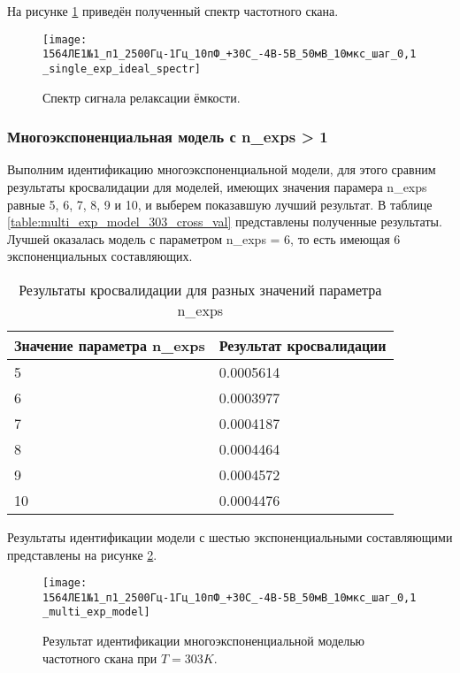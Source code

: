 	На рисунке \ref{pic:spectr_single_exp_ideal_303} приведён полученный спектр
	частотного скана.

	\begin{figure}[!htp]
		\centering
		\texttt{[image: 1564ЛЕ1№1\_п1\_2500Гц-1Гц\_10пФ\_+30С\_-4В-5В\_50мВ\_10мкс\_шаг\_0,1\_single\_exp\_ideal\_spectr]}
		\caption{Спектр сигнала релаксации ёмкости.}
		\label{pic:spectr_single_exp_ideal_303}
	\end{figure}


	\newpage
	\subsubsection{Многоэкспоненциальная модель с n\_exps > 1}
	Выполним идентификацию многоэкспоненциальной модели, для этого сравним
	результаты кросвалидации для моделей, имеющих значения парамера n\_exps
	равные 5, 6, 7, 8, 9 и 10, и выберем показавшую лучший результат. В таблице
	\ref{table:multi_exp_model_303_cross_val} представлены полученные результаты.
	Лучшей оказалась модель с параметром n\_exps = 6, то есть имеющая 6 
	экспоненциальных составляющих.

	\begin{table}[!htp]
		\centering
		\caption{Результаты кросвалидации для разных значений параметра n\_exps}
		\begin{tabular}{|l|l|}
		\hline
		Значение параметра n\_exps & Результат кросвалидации \\ \hline
		5                          & 0.0005614               \\ \hline
		6                          & 0.0003977               \\ \hline
		7                          & 0.0004187               \\ \hline
		8                          & 0.0004464               \\ \hline
		9                          & 0.0004572               \\ \hline
		10                         & 0.0004476               \\ \hline
		\end{tabular}
		\label{table:multi_exp_model_283_cross_val}
	\end{table}

	Результаты идентификации модели с шестью экспоненциальными составляющими
	представлены на рисунке \ref{pic:multi_exp_model_303}.

	\begin{figure}[!htp]
		\centering
		\texttt{[image: 1564ЛЕ1№1\_п1\_2500Гц-1Гц\_10пФ\_+30С\_-4В-5В\_50мВ\_10мкс\_шаг\_0,1\_multi\_exp\_model]}
		\caption{Результат идентификации многоэкспоненциальной моделью 
		         частотного скана при $T=303K$.}
		\label{pic:multi_exp_model_303}
	\end{figure}

